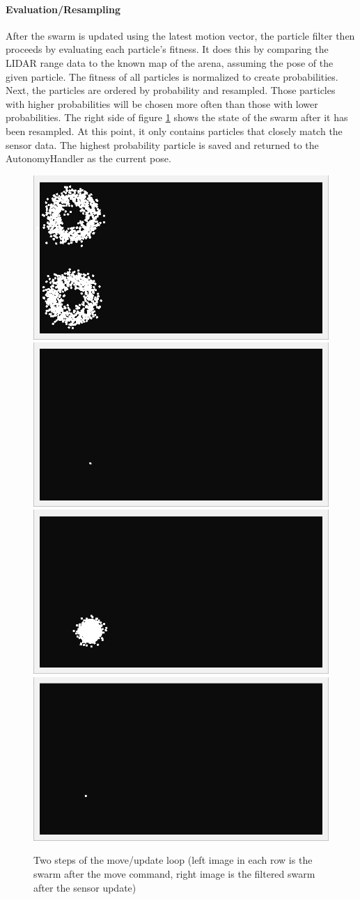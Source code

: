 \paragraph{Evaluation/Resampling}
After the swarm is updated using the latest motion vector, the particle filter then proceeds by evaluating each particle's fitness.  It does this by comparing the LIDAR range data to the known map of the arena, assuming the pose of the given particle.  The fitness of all particles is normalized to create probabilities.  Next, the particles are ordered by probability and resampled.  Those particles with higher probabilities will be chosen more often than those with lower probabilities.  The right side of figure \ref{fig:swarm-loop} shows the state of the swarm after it has been resampled.  At this point, it only contains particles that closely match the sensor data.  The highest probability particle is saved and returned to the AutonomyHandler as the current pose.
\begin{figure}[H]
\includegraphics[width=0.5\linewidth]{swarm-first-move.png}\includegraphics[width=0.5\linewidth]{swarm-first-update.png}
\includegraphics[width=0.5\linewidth]{swarm-second-move.png}\includegraphics[width=0.5\linewidth]{swarm-second-update.png}
\caption[Swarm Move/Update]{Two steps of the move/update loop (left image in each row is the swarm after the move command, right image is the filtered swarm after the sensor update)}
\label{fig:swarm-loop}
\end{figure}
